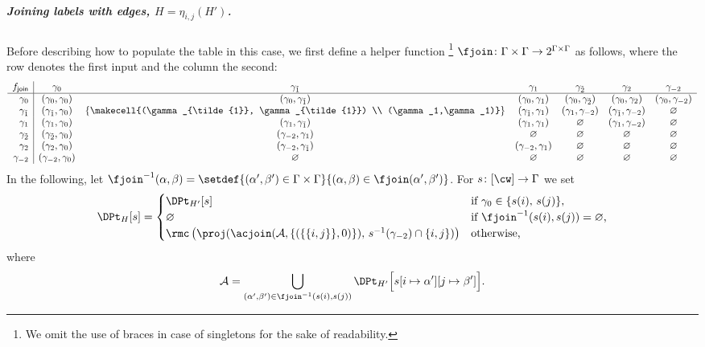 \subparagraph{Joining labels with edges, $H = \eta_{i,j}(H')$.}
Before describing how to populate the table in this case,
we first define a helper function%
\footnote{We omit the use of braces in case of singletons for the sake of readability.}
$\fjoin \colon \Gamma \times \Gamma \to 2^{\Gamma \times \Gamma}$
as follows, where the row denotes the first input and the column the second:
\[
	\begin{array}{r|cccccc}
		f_{\mathsf{join}} 	& \gamma_0 							& \gamma_{\tilde{1}} 																			& \gamma_1 							& \gamma_{\tilde{2}} 				& \gamma_2 							& \gamma_{-2} \\
		\hline
		\gamma_0 			& (\gamma_0, \gamma_0) 				& (\gamma_0, \gamma_{\tilde{1}}) 																& (\gamma_0, \gamma_1) 				& (\gamma_0, \gamma_{\tilde{2}}) 	& (\gamma_0, \gamma_2) 				& (\gamma_0, \gamma_{-2}) \\
		\gamma_{\tilde{1}} 	& (\gamma_{\tilde{1}}, \gamma_0) 	& \left\{\makecell{(\gamma_{\tilde{1}}, \gamma_{\tilde{1}}) \\ (\gamma_1,\gamma_1)} \right\} 	& (\gamma_{\tilde{1}}, \gamma_1) 	& (\gamma_1, \gamma_{-2}) 			& (\gamma_{\tilde{1}}, \gamma_{-2}) & \varnothing \\
		\gamma_1 			& (\gamma_1, \gamma_0) 				& (\gamma_1, \gamma_{\tilde{1}}) 																& (\gamma_1, \gamma_1) 				& \varnothing 								& (\gamma_1, \gamma_{-2}) 	& \varnothing \\
		\gamma_{\tilde{2}} 	& (\gamma_{\tilde{2}}, \gamma_0)	& (\gamma_{-2}, \gamma_1) 																		& \varnothing 						& \varnothing 								& \varnothing 				& \varnothing \\
		\gamma_2 			& (\gamma_2, \gamma_0) 				& (\gamma_{-2}, \gamma_{\tilde{1}}) 															& (\gamma_{-2}, \gamma_1) 			& \varnothing 								& \varnothing 				& \varnothing \\
		\gamma_{-2}			& (\gamma_{-2}, \gamma_0) 			& \varnothing																					& \varnothing 						& \varnothing 								& \varnothing 				& \varnothing
	\end{array}
\]
In the following, let $\fjoin^{-1}(\alpha, \beta) = \setdef{(\alpha', \beta') \in \Gamma \times \Gamma}{(\alpha,\beta) \in \fjoin(\alpha', \beta')}$.
For $s \colon [\cw] \to \Gamma$ we set
\[
    \DPt_H[s] =
        \begin{cases}
			\DPt_{H'}[s]		&\text{if $\gamma_0 \in \{s(i), \, s(j)\}$,}\\
            \varnothing			&\text{if $\fjoin^{-1}(s(i),s(j)) = \varnothing$,}\\
            \rmc\left(
				\proj(\acjoin(\mathcal{A},\{ ( \{\{i,j\}\},0)\}), \, s^{-1}(\gamma_{-2}) \cap \{i,j\})
        	\right) 			&\text{otherwise,}
        \end{cases}
\]
where
\[
	\mathcal{A} = \bigcup_{(\alpha',\beta') \in \fjoin^{-1}(s(i),s(j))} \DPt_{H'} \Bigl[ s[i \mapsto \alpha'][j \mapsto \beta'] \Bigr].
\]


